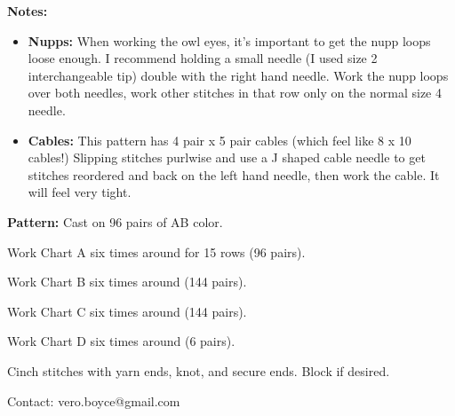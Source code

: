 \documentclass[11pt]{article}
\begin{document}
\smallskip
\textbf{Notes:}
\begin{itemize}
	\item \textbf{Nupps:} When working the owl eyes, it's important to get the nupp loops loose enough. I recommend holding a small needle (I used size 2 interchangeable tip) double with the right hand needle. Work the nupp loops over both needles, work other stitches in that row only on the normal size 4 needle. 
	\item \textbf{Cables:} This pattern has 4 pair x 5 pair cables (which feel like 8 x 10 cables!) Slipping stitches purlwise and use a J shaped cable needle to get stitches reordered and back on the left hand needle, then work the cable. It will feel very tight. 
\end{itemize}

\smallskip

\textbf{Pattern:}
Cast on 96 pairs of AB color. 

Work Chart A six times around for 15 rows (96 pairs). 

Work Chart B six times around (144 pairs). 

Work Chart C six times around (144 pairs). 

Work Chart D six times around (6 pairs). 

Cinch stitches with yarn ends, knot, and secure ends. Block if desired. 


\doclicenseThis
Contact: vero.boyce@gmail.com
\end{document}
